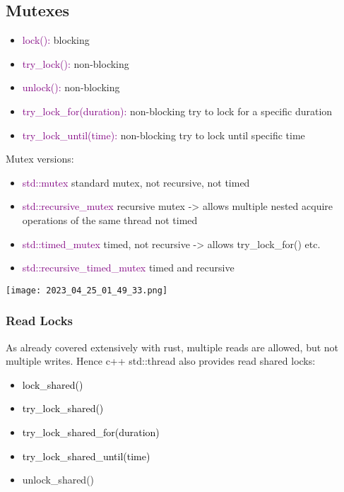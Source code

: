 \documentclass[main.tex,fontsize=8pt,paper=a4,paper=portrait,DIV=calc,]{scrartcl}
\begin{document}
\subsection{Mutexes}
\begin{itemize}
\item \textcolor{purple}{lock():} blocking
\item \textcolor{purple}{try\_lock():} non-blocking
\item \textcolor{purple}{unlock():} non-blocking
\item \textcolor{purple}{try\_lock\_for(duration):} non-blocking\newline
  try to lock for a specific duration
\item \textcolor{purple}{try\_lock\_until(time):} non-blocking\newline
  try to lock until specific time
\end{itemize} 
Mutex versions: 
\begin{itemize}
\item \textcolor{purple}{std::mutex}\newline
  standard mutex, not recursive, not timed 
\item \textcolor{purple}{std::recursive\_mutex}\newline
  recursive mutex -> allows multiple nested acquire operations of the same thread\newline
  not timed
\item \textcolor{purple}{std::timed\_mutex}\newline
  timed, not recursive -> allows try\_lock\_for() etc.
\item \textcolor{purple}{std::recursive\_timed\_mutex}\newline
  timed and recursive
\end{itemize} 
\texttt{[image: 2023\_04\_25\_01\_49\_33.png]}

\subsubsection{Read Locks}
As already covered extensively with rust, multiple reads are allowed, but not multiple writes.\newline
Hence c++ std::thread also provides read shared locks: 
\begin{itemize}
  \item \textcolor{black}{lock\_shared()}
\item \textcolor{black}{try\_lock\_shared()}
\item \textcolor{black}{try\_lock\_shared\_for(duration)}
\item \textcolor{black}{try\_lock\_shared\_until(time)}
\item unlock\_shared()
\end{itemize} 
\end{document}

